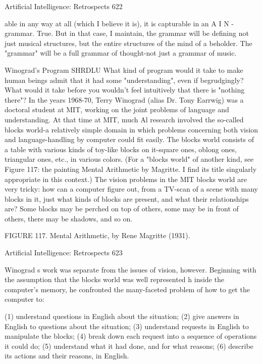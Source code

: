 {Artificial Intelligence: Retrospects                                                    622

able in any way at all (which I believe it is), it is capturable in an A I N - grammar. True.
But in that case, I maintain, the grammar will be defining not just musical structures, but
the entire structures of the mind of a beholder. The "grammar" will be a full grammar of
thought-not just a grammar of music.

                          Winograd's Program SHRDLU
What kind of program would it take to make human beings admit that it had some
"understanding", even if begrudgingly? What would it take before you wouldn't feel
intuitively that there is "nothing there"?
         In the years 1968-70, Terry Winograd (alias Dr. Tony Earrwig) was a doctoral
student at MIT, working on the joint problems of language and understanding. At that
time at MIT, much Al research involved the so-called blocks world-a relatively simple
domain in which problems concerning both vision and language-handling by computer
could fit easily. The blocks world consists of a table with various kinds of toy-like blocks
on it-square ones, oblong ones, triangular ones, etc., in various colors. (For a "blocks
world" of another kind, see Figure 117: the painting Mental Arithmetic by Magritte. I find
its title singularly appropriate in this context.) The vision problems in the MIT blocks
world are very tricky: how can a computer figure out, from a TV-scan of a scene with
many blocks in it, just what kinds of blocks are present, and what their relationships are?
Some blocks may be perched on top of others, some may be in front of others, there may
be shadows, and so on.

               FIGURE 117. Mental Arithmetic, by Rene Magritte (1931).




Artificial Intelligence: Retrospects                                                     623

       Winograd s work was separate from the issues of vision, however. Beginning with
the assumption that the blocks world was well represented h inside the computer's
memory, he confronted the many-faceted problem of how to get the computer to:

   (1) understand questions in English about the situation;
   (2) give answers in English to questions about the situation;
   (3) understand requests in English to manipulate the blocks;
   (4) break down each request into a sequence of operations it could do;
   (5) understand what it had done, and for what reasons;
   (6) describe its actions and their reasons, in English.

}
